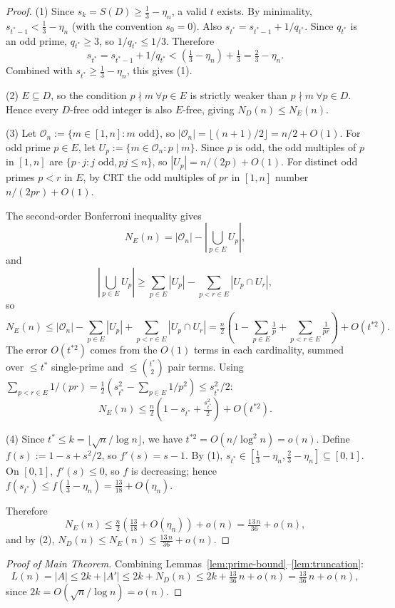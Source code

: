 \documentclass{article}
\begin{document}
\begin{proof}
(1) Since $s_k = S(D) \ge \tfrac{1}{3} - \eta_n$, a valid $t$ exists. By minimality, $s_{t^*-1} < \tfrac{1}{3} - \eta_n$ (with the convention $s_0 = 0$). Also $s_{t^*} = s_{t^*-1} + 1/q_{t^*}$. Since $q_{t^*}$ is an odd prime, $q_{t^*} \ge 3$, so $1/q_{t^*} \le 1/3$. Therefore
\[
s_{t^*} = s_{t^*-1} + 1/q_{t^*} < (\tfrac{1}{3} - \eta_n) + \tfrac{1}{3} = \tfrac{2}{3} - \eta_n.
\]
Combined with $s_{t^*} \ge \tfrac{1}{3} - \eta_n$, this gives (1).

(2) $E \subseteq D$, so the condition $p \nmid m\ \forall p \in E$ is strictly weaker than $p \nmid m\ \forall p \in D$. Hence every $D$-free odd integer is also $E$-free, giving $N_D(n) \le N_E(n)$.

(3) Let $\mathcal{O}_n := \{m \in [1, n] : m \text{ odd}\}$, so $|\mathcal{O}_n| = \lfloor (n+1)/2 \rfloor = n/2 + O(1)$. For odd prime $p \in E$, let $U_p := \{m \in \mathcal{O}_n : p \mid m\}$. Since $p$ is odd, the odd multiples of $p$ in $[1, n]$ are $\{p \cdot j : j \text{ odd}, pj \le n\}$, so $|U_p| = n/(2p) + O(1)$. For distinct odd primes $p < r$ in $E$, by CRT the odd multiples of $pr$ in $[1, n]$ number $n/(2pr) + O(1)$.

The second-order Bonferroni inequality gives
\[
N_E(n) = |\mathcal{O}_n| - \left|\bigcup_{p \in E} U_p\right|,
\]
and
\[
\left|\bigcup_{p \in E} U_p\right| \ge \sum_{p \in E} |U_p| - \sum_{p < r \in E} |U_p \cap U_r|,
\]
so
\[
N_E(n) \le |\mathcal{O}_n| - \sum_{p \in E} |U_p| + \sum_{p < r \in E} |U_p \cap U_r| = \tfrac{n}{2}\left(1 - \sum_{p \in E} \tfrac{1}{p} + \sum_{p<r \in E} \tfrac{1}{pr}\right) + O(t^{*2}).
\]
The error $O(t^{*2})$ comes from the $O(1)$ terms in each cardinality, summed over $\le t^*$ single-prime and $\le \binom{t^*}{2}$ pair terms. Using $\sum_{p<r \in E} 1/(pr) = \tfrac{1}{2}(s_{t^*}^2 - \sum_{p \in E} 1/p^2) \le s_{t^*}^2/2$:
\[
N_E(n) \le \tfrac{n}{2}\left(1 - s_{t^*} + \tfrac{s_{t^*}^2}{2}\right) + O(t^{*2}).
\]

(4) Since $t^* \le k = \lfloor\sqrt n/\log n\rfloor$, we have $t^{*2} = O(n/\log^2 n) = o(n)$. Define $f(s) := 1 - s + s^2/2$, so $f'(s) = s - 1$. By (1), $s_{t^*} \in [\tfrac{1}{3} - \eta_n, \tfrac{2}{3} - \eta_n] \subseteq [0, 1]$. On $[0, 1]$, $f'(s) \le 0$, so $f$ is decreasing; hence $f(s_{t^*}) \le f(\tfrac{1}{3} - \eta_n) = \tfrac{13}{18} + O(\eta_n)$.

Therefore
\[
N_E(n) \le \tfrac{n}{2}\left(\tfrac{13}{18} + O(\eta_n)\right) + o(n) = \tfrac{13\, n}{36} + o(n),
\]
and by (2), $N_D(n) \le N_E(n) \le \tfrac{13\, n}{36} + o(n)$.
\end{proof}

\begin{proof}[Proof of Main Theorem]
Combining Lemmas~\ref{lem:prime-bound}–\ref{lem:truncation}:
\[
L(n) = |A| \le 2k + |A'| \le 2k + N_D(n) \le 2k + \tfrac{13}{36}\,n + o(n) = \tfrac{13}{36}\,n + o(n),
\]
since $2k = O(\sqrt{n}/\log n) = o(n)$.
\end{proof}
\end{document}
